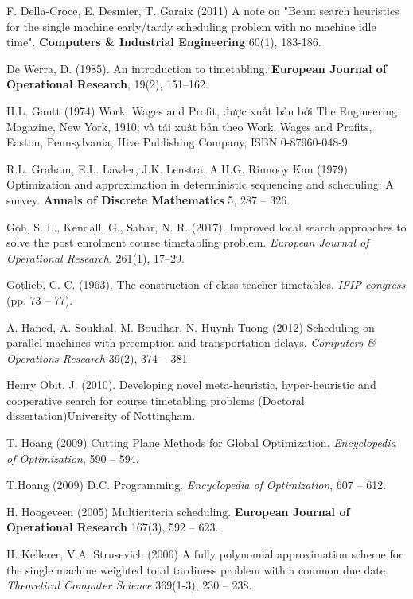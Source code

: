 \documentclass[11pt]{article}
\begin{document}
\begin{thebibliography}{19}
F. Della-Croce, E. Desmier, T. Garaix (2011) 
A note on "Beam search heuristics for the single machine early/tardy scheduling problem with no machine idle time". 
\textbf{Computers \& Industrial Engineering} 60(1), 183-186.

De Werra, D. (1985). 
An introduction to timetabling. 
\textbf{European Journal of Operational Research}, 19(2), 151–162.

H.L. Gantt (1974) 
Work, Wages and Profit, được xuất bản bởi The Engineering Magazine, New York, 1910; và tái xuất bản theo Work, Wages and Profits, Easton, Pennsylvania, Hive Publishing Company, ISBN 0-87960-048-9.

R.L. Graham, E.L. Lawler, J.K. Lenstra, A.H.G. Rinnooy Kan (1979) 
Optimization and approximation in deterministic sequencing and scheduling: A survey. 
\textbf{Annals of Discrete Mathematics} 5, 287 -- 326.

Goh, S. L., Kendall, G., Sabar, N. R. (2017). 
Improved local search approaches to solve the post enrolment course timetabling problem. 
\textit{European Journal of Operational Research}, 261(1), 17–29.

Gotlieb, C. C. (1963). The construction of class-teacher timetables. \textit{IFIP congress} (pp. 73 -- 77).

A. Haned, A. Soukhal, M. Boudhar, N. Huynh Tuong (2012) 
Scheduling on parallel machines with preemption and transportation delays. 
\textit{Computers \& Operations Research} 39(2), 374 -- 381.

Henry Obit, J. (2010). 
Developing novel meta-heuristic, hyper-heuristic and cooperative search for course timetabling problems 
(Doctoral dissertation)University of Nottingham.

T. Hoang (2009) Cutting Plane Methods for Global Optimization. \textit{Encyclopedia of Optimization}, 590 -- 594.

T.Hoang (2009)  D.C. Programming. 
\textit{Encyclopedia of Optimization}, 607 -- 612.

H. Hoogeveen (2005) 
Multicriteria scheduling. 
\textbf{European Journal of Operational Research} 167(3), 592 -- 623.

H. Kellerer, V.A. Strusevich (2006) 
A fully polynomial approximation scheme for the single machine weighted total tardiness problem with a common due date. 
\textit{Theoretical Computer Science} 369(1-3), 230 -- 238.


\end{thebibliography}
\end{document}
